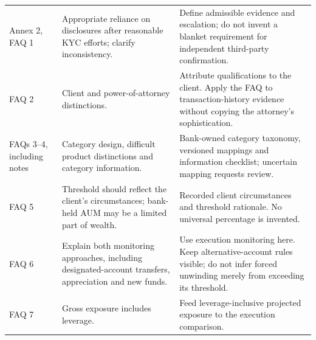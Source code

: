 \begin{longtable}{P{0.14\textwidth}P{0.37\textwidth}P{0.39\textwidth}}
Annex 2, FAQ 1 & Appropriate reliance on disclosures after reasonable KYC efforts; clarify inconsistency. & Define admissible evidence and escalation; do not invent a blanket requirement for independent third-party confirmation.\\
FAQ 2 & Client and power-of-attorney distinctions. & Attribute qualifications to the client. Apply the FAQ to transaction-history evidence without copying the attorney's sophistication.\\
FAQs 3--4, including notes & Category design, difficult product distinctions and category information. & Bank-owned category taxonomy, versioned mappings and information checklist; uncertain mapping requests review.\\
FAQ 5 & Threshold should reflect the client's circumstances; bank-held AUM may be a limited part of wealth. & Recorded client circumstances and threshold rationale. No universal percentage is invented.\\
FAQ 6 & Explain both monitoring approaches, including designated-account transfers, appreciation and new funds. & Use execution monitoring here. Keep alternative-account rules visible; do not infer forced unwinding merely from exceeding its threshold.\\
FAQ 7 & Gross exposure includes leverage. & Feed leverage-inclusive projected exposure to the execution comparison.\\
\bottomrule
\end{longtable}
\endgroup

